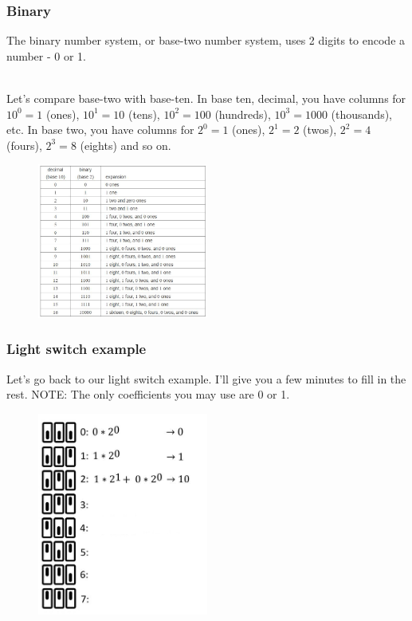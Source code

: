 \documentclass{if-beamer}
\begin{document}
\begin{frame}
\frametitle{Binary}
The binary number system, or base-two number system, uses 2 digits to encode a number - 0 or 1. \\~\

Let's compare base-two with base-ten. In base ten, decimal, you have columns for $10^0 = 1$ (ones), $10^1 = 10$ (tens), $10^2 = 100$ (hundreds), $10^3 = 1000$ (thousands), etc. In base two, you have columns for $2^0 = 1$ (ones), $2^1 = 2$ (twos), $2^2 = 4$ (fours), $2^3 = 8$ (eights) and so on. 

\begin{figure}
	\center
	\includegraphics[width = 0.5\textwidth]{figures/table.jpg}
\end{figure}

\end{frame}

\begin{frame}
\frametitle{Light switch example}
Let's go back to our light switch example. I'll give you a few minutes to fill in the rest. NOTE: The only coefficients you may use are 0 or 1. 
\begin{figure}
	\flushleft
	\includegraphics[width = 0.5\textwidth]{figures/fillinex.jpg}
\end{figure}
\end{frame}
\end{document}
